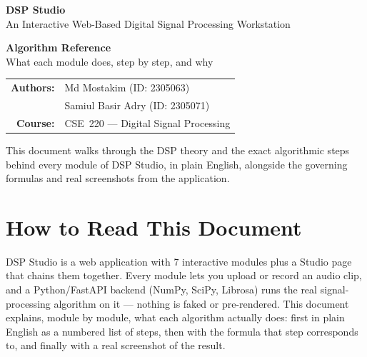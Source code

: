 \documentclass[11pt,a4paper]{article}
\title{\vspace{-2cm}}
\date{}
\begin{document}
\begin{titlepage}
  \vspace{1.1cm}
  {\color{goldAccentBright}\Large\bfseries\hspace{1cm} DSP Studio}\\[0.15cm]
  {\color{white}\hspace{1cm}\small An Interactive Web-Based Digital Signal Processing Workstation}
  \vspace{4.5cm}

  \begin{center}
    {\Huge\bfseries\color{cardBg} Algorithm Reference}\\[0.4em]
    {\large\color{textMutedDark} What each module does, step by step, and why}
    \vspace{2.2cm}

    \renewcommand{\arraystretch}{1.4}
    \begin{tabular}{rl}
      \textbf{Authors:} & Md Mostakim \quad (ID: 2305063) \\
                          & Samiul Basir Adry \quad (ID: 2305071) \\[0.6em]
      \textbf{Course:}  & CSE~220 --- Digital Signal Processing \\
    \end{tabular}

    \vspace{2.5cm}
    {\small\color{textMutedDark} This document walks through the DSP theory and the exact
    algorithmic steps behind every module of DSP Studio, in plain
    English, alongside the governing formulas and real screenshots from
    the application.}
  \end{center}
\end{titlepage}

\tableofcontents
\newpage

\section*{How to Read This Document}
DSP Studio is a web application with 7 interactive modules plus a
Studio page that chains them together. Every module lets you upload or
record an audio clip, and a Python/FastAPI backend (NumPy, SciPy,
Librosa) runs the real signal-processing algorithm on it --- nothing is
faked or pre-rendered. This document explains, module by module, what
each algorithm actually does: first in plain English as a numbered
list of steps, then with the formula that step corresponds to, and
finally with a real screenshot of the result.
\end{document}
